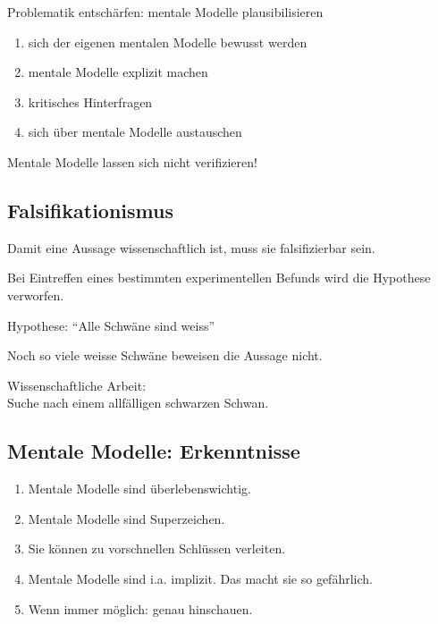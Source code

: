 \documentclass[
	final,
	a4paper,
	oneside,
	parskip=full,
	headings=standardclasses,
	headings=big,
	pointednumbers
]{scrartcl}
\newcommand{\txb}[1]{{\color{blue}#1}}
\newcommand{\txr}[1]{{\color{red}#1}}
\begin{document}
        Problematik entschärfen: mentale Modelle plausibilisieren



        \begin{enumerate}[label=\arabic*.]
            \setlength{\parskip}{1mm}
            \item sich der eigenen mentalen Modelle bewusst werden
            \item mentale Modelle explizit machen
            \item kritisches Hinterfragen
            \item sich über mentale Modelle austauschen
        \end{enumerate}

        Mentale Modelle lassen sich \txr{nicht verifizieren}!

	\subsection*{Falsifikationismus}

        Damit eine Aussage wissenschaftlich ist, muss sie falsifizierbar sein.

        Bei Eintreffen eines bestimmten experimentellen Befunds wird die
        Hypothese verworfen.

        Hypothese: "`Alle Schwäne sind weiss"'
        
        Noch so viele weisse Schwäne beweisen die Aussage nicht.

        Wissenschaftliche Arbeit:\\
        Suche nach einem allfälligen schwarzen Schwan.

	\subsection*{Mentale Modelle: Erkenntnisse}

        \begin{enumerate}[label=$\bullet$]
            \setlength{\parskip}{1mm}
            \item Mentale Modelle sind \txb{überlebenswichtig}.
            \item Mentale Modelle sind \txb{Superzeichen}.
            \item Sie können zu vorschnellen Schlüssen verleiten.
            \item Mentale Modelle sind i.a. \txb{implizit}. Das macht sie so gefährlich.
            \item Wenn immer möglich: \txb{genau hinschauen}.
        \end{enumerate}
        
\end{document}
